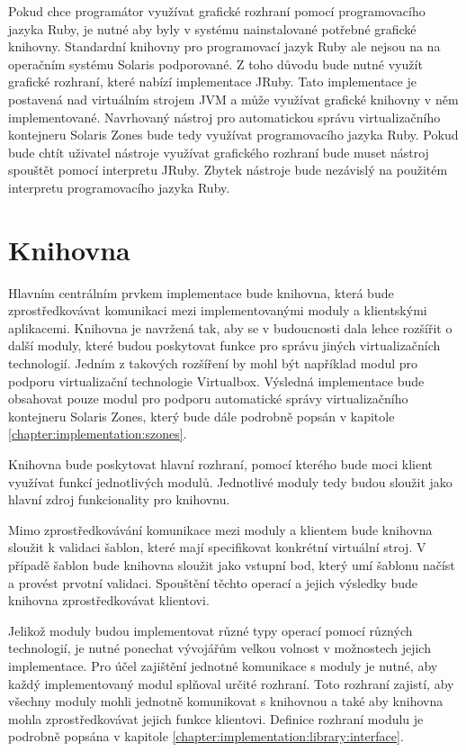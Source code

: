 Pokud chce programátor využívat grafické rozhraní pomocí programovacího jazyka Ruby, je nutné aby byly v systému
nainstalované potřebné grafické knihovny. Standardní knihovny pro programovací jazyk Ruby ale nejsou na na operačním
systému Solaris podporované. Z toho důvodu bude nutné využít grafické rozhraní, které nabízí implementace JRuby.
Tato implementace je postavená nad virtuálním strojem JVM a může využívat grafické knihovny v něm implementované.
Navrhovaný nástroj pro automatickou správu virtualizačního kontejneru Solaris Zones bude tedy využívat programovacího
jazyka Ruby. Pokud bude chtít uživatel nástroje využívat grafického rozhraní bude muset nástroj spouštět pomocí
interpretu JRuby. Zbytek nástroje bude nezávislý na použitém interpretu programovacího jazyka Ruby.
\section{Knihovna}
\label{chapter:implementation:library}
Hlavním centrálním prvkem implementace bude knihovna, která bude zprostředkovávat komunikaci mezi implementovanými moduly
a klientskými aplikacemi. Knihovna je navržená tak, aby se v budoucnosti dala lehce rozšířit o další moduly, které budou
poskytovat funkce pro správu jiných virtualizačních technologií. Jedním z takových rozšíření by mohl být například modul
pro podporu virtualizační technologie Virtualbox. Výsledná implementace bude obsahovat pouze modul pro podporu automatické
správy virtualizačního kontejneru Solaris Zones, který bude dále podrobně popsán v kapitole \ref{chapter:implementation:szones}.

Knihovna bude poskytovat hlavní rozhraní, pomocí kterého bude moci klient využívat funkcí jednotlivých modulů. Jednotlivé
moduly tedy budou sloužit jako hlavní zdroj funkcionality pro knihovnu.

Mimo zprostředkovávání komunikace mezi moduly a klientem bude knihovna sloužit k validaci šablon, které mají specifikovat
konkrétní virtuální stroj. V případě šablon bude knihovna sloužit jako vstupní bod, který umí šablonu načíst a provést
prvotní validaci. Spouštění těchto operací a jejich výsledky bude knihovna zprostředkovávat klientovi.

Jelikož moduly budou implementovat různé typy operací pomocí různých technologií, je nutné ponechat vývojářům velkou volnost
v možnostech jejich implementace. Pro účel zajištění jednotné komunikace s moduly je nutné, aby každý implementovaný modul
splňoval určité rozhraní. Toto rozhraní zajistí, aby všechny moduly mohli jednotně komunikovat s knihovnou a také aby knihovna
mohla zprostředkovávat jejich funkce klientovi. Definice rozhraní modulu je podrobně popsána v kapitole 
\ref{chapter:implementation:library:interface}.

